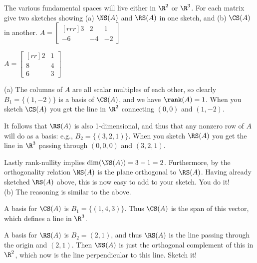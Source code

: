The various fundamental spaces will live either in $\R^2$ or $\R^3$. For each matrix give two sketches showing (a) $\NS(A)$ and $\RS(A)$ in one sketch, and (b) $\CS(A)$ in another. 
\bb
\ii $A=\begin{bmatrix}[rrr]
3&2&1\\
-6&-4&-2
\end{bmatrix}$

\ii $A=\begin{bmatrix}[rr]
2&1\\
8&4\\
6&3
\end{bmatrix}
$
\ee
\begin{solution}
\noindent (a) The columns of $A$ are all scalar multiples of each other, so clearly $B_1=\{(1,-2)\}$ is a basis of $\CS(A)$, and we have $\rank(A)=1$. When you sketch $\CS(A)$ you get the line in $\R^2$  connecting $(0,0)$ and $(1,-2)$. 

It follows that $\RS(A)$ is also 1-dimensional, and thus that any nonzero row of $A$ will do as a basis: e.g., $B_2=\{(3,2,1)\}$. When you sketch $\RS(A)$ you get the line in $\R^3$ passing through $(0,0,0)$ and $(3,2,1)$. 

Lastly rank-nullity implies $\dim(\NS(A))=3-1=2$. Furthermore, by the orthogonality relation $\NS(A)$ is the plane orthogonal to $\RS(A)$. Having already sketched $\RS(A)$ above, this is now easy to add to your sketch. You do it! 
\\
(b)
The reasoning is similar to the above. 

A basis for $\CS(A)$ is $B_1=\{(1,4,3)\}$. Thus $\CS(A)$ is the span of this vector, which defines a line in $\R^3$. 

A basis for $\RS(A)$ is $B_2=(2,1)$, and thus $\RS(A)$ is the line passing through the origin and $(2,1)$. Then $\NS(A)$ is just the orthogonal complement of this in $\R^2$, which now is the line perpendicular to this line. Sketch it!  
\end{solution}

